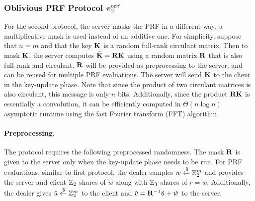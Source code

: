 \subsubsection{Oblivious PRF Protocol $\boldsymbol{\pi}^{\textsf{oprf}}_2$}
\label{subsec:oprf2}
For the second protocol, the server masks the PRF in a different way; a multiplicative mask is used instead of an additive one. For simplicity, suppose that $n=m$ and that the key $\mat{K}$ is a random full-rank circulant matrix. Then to mask $\mat{K}$, the server computes $\bar{\mat{K}} = \mat{R}\mat{K}$ using a random matrix $\mat{R}$ that is also full-rank and circulant. $\mat{R}$ will be provided as preprocessing to the server, and can be reused for multiple PRF evaluations. The server will send $\bar{\mat{K}}$ to the client in the key-update phase. Note that since the product of two circulant matrices is also circulant, this message is only $n$ bits. Additionally, since the product $\mat{R}\mat{K}$ is essentially a convolution, it can be efficiently computed in $\Theta(n\log n)$ asymptotic runtime using the fast Fourier transform (FFT) algorithm.

\paragraph{Preprocessing.} The protocol requires the following preprocessed randomness. The mask $\mat{R}$ is given to the server only when the key-update phase needs to be run. For PRF evaluations, similar to first protocol, the dealer samples $w \xleftarrow{\$} \mathbb{Z}_2^m$ and provides the server and client $\mathbb{Z}_2$ shares of $\tilde{w}$ along with $\mathbb{Z}_3$ shares of $r = \tilde{w}$. Additionally, the dealer gives $\tilde{u} \xleftarrow{\$} \mathbb{Z}_2^m$ to the client and $\tilde{v} = \mat{R}^{-1}\tilde{u} + \tilde{w}$ to the server.

